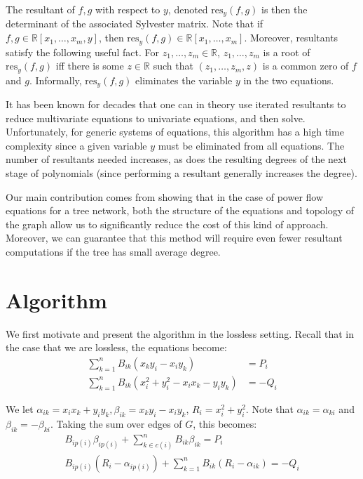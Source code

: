 \documentclass[10pt, a4paper, twoside]{article}
\theoremstyle{plain}
\numberwithin{equation}{section}
\theoremstyle{definition}
\theoremstyle{remark}
\newcommand{\real}{\mathbb{R}}
\newcommand{\res}{\text{res}}
\begin{document}
The resultant of $f,g$ with respect to $y$, denoted $\res_y(f,g)$ is then the determinant of the associated Sylvester matrix. Note that if $f,g \in \real[x_1,\ldots, x_m,y]$, then $\res_y(f,g) \in \real[x_1,\ldots,x_m]$. Moreover, resultants satisfy the following useful fact. For $z_1,\ldots, z_m \in \real$, $z_1,\ldots, z_m$ is a root of $\res_y(f,g)$ iff there is some $z \in \real$ such that $(z_1,\ldots, z_m,z)$ is a common zero of $f$ and $g$. Informally, $\res_y(f,g)$ eliminates the variable $y$ in the two equations.

It has been known for decades that one can in theory use iterated resultants to reduce multivariate equations to univariate equations, and then solve. Unfortunately, for generic systems of equations, this algorithm has a high time complexity since a given variable $y$ must be eliminated from all equations. The number of resultants needed increases, as does the resulting degrees of the next stage of polynomials (since performing a resultant generally increases the degree).

Our main contribution comes from showing that in the case of power flow equations for a tree network, both the structure of the equations and topology of the graph allow us to significantly reduce the cost of this kind of approach. Moreover, we can guarantee that this method will require even fewer resultant computations if the tree has small average degree.

\section{Algorithm}

We first motivate and present the algorithm in the lossless setting. 
Recall that in the case that we are lossless, the equations become:
\begin{align*}
\sum_{k=1}^n B_{ik}(x_ky_i-x_iy_k) &= P_i\\
\sum_{k=1}^n B_{ik}(x_i^2+y_i^2-x_ix_k-y_iy_k) &= -Q_i
\end{align*}

We let $\alpha_{ik} = x_ix_k+y_iy_k, \beta_{ik} = x_ky_i-x_iy_k$, $R_i = x_i^2+y_i^2$. Note that $\alpha_{ik} = \alpha_{ki}$ and $\beta_{ik} = -\beta_{ki}$. Taking the sum over edges of $G$, this becomes:
\begin{align*}
B_{ip(i)}\beta_{ip(i)} + \sum_{k \in c(i)}^n B_{ik}\beta_{ik} = P_i\\
B_{ip(i)}(R_i-\alpha_{ip(i)}) + \sum_{k=1}^n B_{ik}(R_i-\alpha_{ik}) = -Q_i
\end{align*}
\end{document}
